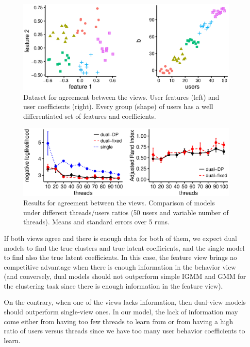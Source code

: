 \documentclass[smallextended]{svjour3}          %
\begin{document}
\begin{figure}
	\centering
	\includegraphics[width=1\textwidth]{Fig2_data_agreement_bw}
	\caption{Dataset for agreement between the views. User features (left) and user coefficients (right). Every group (shape) of users has a well differentiated set of features and coefficients.}
	\label{fig:data_agreement}
\end{figure}
\begin{figure}
	\centering
	\includegraphics[width=1\textwidth]{Fig3_results_agreement_bw}%
	\caption{Results for agreement between the views. Comparison of models under different threads/users ratios (50 users and variable number of threads). Means and standard errors over 5 runs.}
	\label{fig:results_agreement}
\end{figure}


If both views agree and there is enough data for both of them, we expect dual models to find the true clusters and true latent coefficients, and the single model to find also the true latent coefficients. In this case, the feature view brings no competitive advantage when there is enough information in the behavior view (and conversely, dual models should not outperform simple IGMM and GMM for the clustering task since there is enough information in the feature view).

On the contrary, when one of the views lacks information, then dual-view models should outperform single-view ones. In our model, the lack of information may come either from having too few threads to learn from or from having a high ratio of users versus threads since we have too many user behavior coefficients to learn. 
\end{document}
